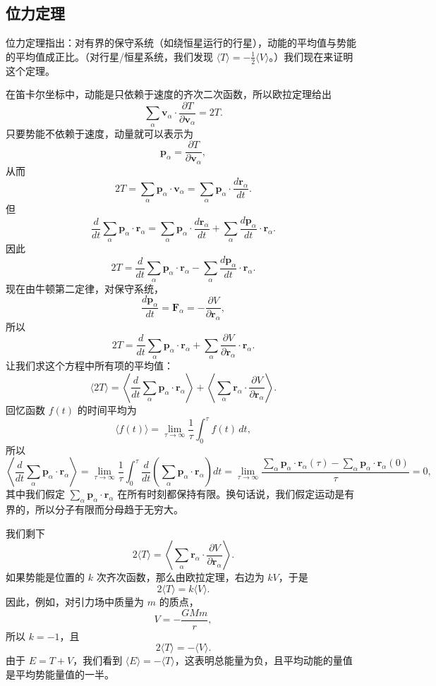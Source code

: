 \subsection*{位力定理}

位力定理指出：对有界的保守系统（如绕恒星运行的行星），动能的平均值与势能的平均值成正比。（对行星/恒星系统，我们发现 $\langle T\rangle = -\frac{1}{2}\langle V\rangle$。）我们现在来证明这个定理。

在笛卡尔坐标中，动能是只依赖于速度的齐次二次函数，所以欧拉定理给出
$$
\sum_{\alpha}\mathbf{v}_\alpha\cdot\frac{\partial T}{\partial \mathbf{v}_\alpha} = 2T.
$$
只要势能不依赖于速度，动量就可以表示为
$$
\mathbf{p}_\alpha = \frac{\partial T}{\partial \mathbf{v}_\alpha},
$$
从而
$$
2T = \sum_{\alpha}\mathbf{p}_\alpha\cdot\mathbf{v}_\alpha = \sum_{\alpha}\mathbf{p}_\alpha\cdot\frac{d\mathbf{r}_\alpha}{dt}.
$$
但
$$
\frac{d}{dt}\sum_{\alpha}\mathbf{p}_\alpha\cdot\mathbf{r}_\alpha = \sum_{\alpha}\mathbf{p}_\alpha\cdot\frac{d\mathbf{r}_\alpha}{dt} + \sum_{\alpha}\frac{d\mathbf{p}_\alpha}{dt}\cdot\mathbf{r}_\alpha.
$$
因此
$$
2T = \frac{d}{dt}\sum_{\alpha}\mathbf{p}_\alpha\cdot\mathbf{r}_\alpha - \sum_{\alpha}\frac{d\mathbf{p}_\alpha}{dt}\cdot\mathbf{r}_\alpha.
$$
现在由牛顿第二定律，对保守系统，
$$
\frac{d\mathbf{p}_\alpha}{dt} = \mathbf{F}_\alpha = -\frac{\partial V}{\partial \mathbf{r}_\alpha},
$$
所以
$$
2T = \frac{d}{dt}\sum_{\alpha}\mathbf{p}_\alpha\cdot\mathbf{r}_\alpha + \sum_{\alpha}\frac{\partial V}{\partial \mathbf{r}_\alpha}\cdot\mathbf{r}_\alpha.
$$
让我们求这个方程中所有项的平均值：
$$
\langle 2T\rangle = \left\langle\frac{d}{dt}\sum_{\alpha}\mathbf{p}_\alpha\cdot\mathbf{r}_\alpha\right\rangle + \left\langle\sum_{\alpha}\mathbf{r}_\alpha\cdot\frac{\partial V}{\partial \mathbf{r}_\alpha}\right\rangle.
$$
回忆函数 $f(t)$ 的时间平均为
$$
\langle f(t)\rangle = \lim_{\tau\to\infty}\frac{1}{\tau}\int_0^{\tau} f(t)\,dt,
$$
所以
$$
\left\langle\frac{d}{dt}\sum_{\alpha}\mathbf{p}_\alpha\cdot\mathbf{r}_\alpha\right\rangle = \lim_{\tau\to\infty}\frac{1}{\tau}\int_0^{\tau}\frac{d}{dt}\left(\sum_{\alpha}\mathbf{p}_\alpha\cdot\mathbf{r}_\alpha\right)dt = \lim_{\tau\to\infty}\frac{\sum_{\alpha}\mathbf{p}_\alpha\cdot\mathbf{r}_\alpha(\tau) - \sum_{\alpha}\mathbf{p}_\alpha\cdot\mathbf{r}_\alpha(0)}{\tau} = 0,
$$
其中我们假定 $\sum_{\alpha}\mathbf{p}_\alpha\cdot\mathbf{r}_\alpha$ 在所有时刻都保持有限。换句话说，我们假定运动是有界的，所以分子有限而分母趋于无穷大。

我们剩下
$$
2\langle T\rangle = \left\langle\sum_{\alpha}\mathbf{r}_\alpha\cdot\frac{\partial V}{\partial \mathbf{r}_\alpha}\right\rangle.
$$
如果势能是位置的 $k$ 次齐次函数，那么由欧拉定理，右边为 $kV$，于是
$$
2\langle T\rangle = k\langle V\rangle.
$$
因此，例如，对引力场中质量为 $m$ 的质点，
$$
V = -\frac{GMm}{r},
$$
所以 $k = -1$，且
$$
2\langle T\rangle = -\langle V\rangle.
$$
由于 $E = T + V$，我们看到 $\langle E\rangle = -\langle T\rangle$，这表明总能量为负，且平均动能的量值是平均势能量值的一半。


